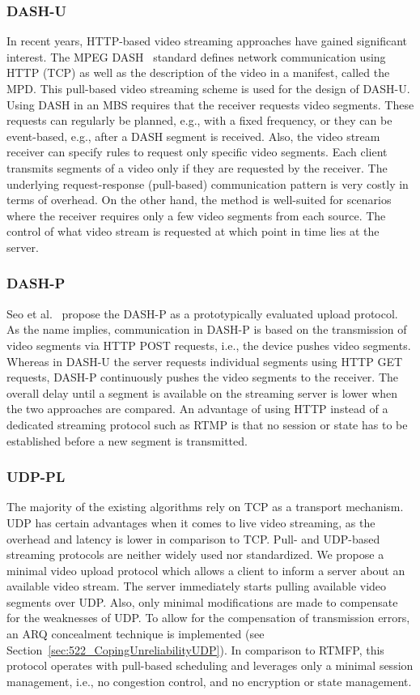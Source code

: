 \subsubsection{\acf{DASH-U}}
In recent years, \ac{HTTP}-based video streaming approaches have gained significant interest. 
The \ac{MPEG} \ac{DASH}~\cite{Stockhammer2011} standard defines network communication using \ac{HTTP} (\ac{TCP}) as well as the description of the video in a manifest, called the \ac{MPD}.
This pull-based video streaming scheme is used for the design of \ac{DASH-U}.
Using \ac{DASH} in an \ac{MBS} requires that the receiver requests video segments. 
These requests can regularly be planned, e.g., with a fixed frequency, or they can be event-based, e.g., after a \ac{DASH} segment is received.
Also, the video stream receiver can specify rules to request only specific video segments.
Each client transmits segments of a video only if they are requested by the receiver.
The underlying request-response (pull-based) communication pattern is very costly in terms of overhead.
On the other hand, the method is well-suited for scenarios where the receiver requires only a few video segments from each source. 
The control of what video stream is requested at which point in time lies at the server.
\subsubsection{\acf{DASH-P}}
Seo et al.~\cite{Seo2012} propose the \ac{DASH-P} as a prototypically evaluated upload protocol. 
As the name implies, communication in \ac{DASH-P} is based on the transmission of video segments via \ac{HTTP} POST requests, i.e., the device pushes video segments.
Whereas in \ac{DASH-U} the server requests individual segments using \ac{HTTP} GET requests, \ac{DASH-P} continuously pushes the video segments to the receiver. 
The overall delay until a segment is available on the streaming server is lower when the two approaches are compared.
An advantage of using \ac{HTTP} instead of a dedicated streaming protocol such as \ac{RTMP} is that no session or state has to be established before a new segment is transmitted.
\subsubsection{\acf{UDP-PL}}
The majority of the existing algorithms rely on \ac{TCP} as a transport mechanism.
\ac{UDP} has certain advantages when it comes to live video streaming, as the overhead and latency is lower in comparison to \ac{TCP}.
Pull- and \ac{UDP}-based streaming protocols are neither widely used nor standardized.
We propose a minimal video upload protocol which allows a client to inform a server about an available video stream.
The server immediately starts pulling available video segments over \ac{UDP}.
Also, only minimal modifications are made to compensate for the weaknesses of \ac{UDP}.
To allow for the compensation of transmission errors, an \ac{ARQ} concealment technique is implemented (see Section~\ref{sec:522_CopingUnreliabilityUDP}).
In comparison to \ac{RTMFP}, this protocol operates with pull-based scheduling and leverages only a minimal session management, i.e., no congestion control, and no encryption or state management.
